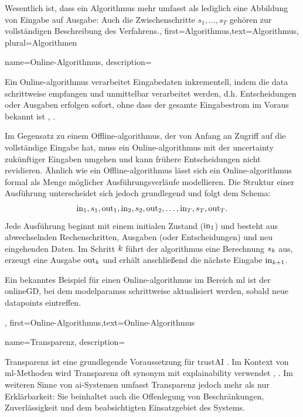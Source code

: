 {{{{{{		Wesentlich ist, dass ein Algorithmus mehr umfasst als lediglich eine Abbildung von Eingabe 
		auf Ausgabe: Auch die Zwischenschritte $s_1,\ldots,s_T$ gehören zur vollständigen Beschreibung des Verfahrens.},
	first={Algorithmus},text={Algorithmus}, plural={Algorithmen}
}

{name={Online-Algorithmus},
	description={Ein Online-\gls{algorithmus} verarbeitet Eingabedaten inkrementell, 
		indem die \gls{data} schrittweise empfangen und unmittelbar verarbeitet werden, 
		d.h. Entscheidungen oder Ausgaben erfolgen sofort, ohne dass der gesamte Eingabestrom im Voraus bekannt ist 
		\cite{PredictionLearningGames}, \cite{HazanOCO}. 
		
		Im Gegensatz zu einem Offline-\gls{algorithmus}, der von Anfang an Zugriff auf die vollständige Eingabe hat, 
		muss ein Online-\gls{algorithmus} mit der \gls{uncertainty} zukünftiger Eingaben umgehen und kann frühere 
		Entscheidungen nicht revidieren. Ähnlich wie ein Offline-\gls{algorithmus} lässt sich ein Online-\gls{algorithmus} 
		formal als Menge möglicher Ausführungsverläufe modellieren. Die Struktur einer Ausführung unterscheidet sich jedoch 
		grundlegend und folgt dem Schema:
		\[
		{\rm in}_{1},s_1,{\rm out}_{1},{\rm in}_{2},s_2,{\rm out}_{2},\ldots,{\rm in}_{T},s_T,{\rm out}_{T}.
		\]
		Jede Ausführung beginnt mit einem initialen Zustand (\({\rm in}_{1}\)) und besteht aus abwechselnden 
		Rechenschritten, Ausgaben (oder Entscheidungen) und neu eingehenden Daten. 
		Im Schritt \(k\) führt der \gls{algorithmus} eine Berechnung \(s_{k}\) aus, 
		erzeugt eine Ausgabe \({\rm out}_{k}\) und erhält anschließend die nächste Eingabe \({\rm in}_{k+1}\). 
		
		Ein bekanntes Beispiel für einen Online-\gls{algorithmus} im Bereich \gls{ml} ist der 
		\gls{onlineGD}, bei dem \glspl{modelparams} schrittweise aktualisiert werden, sobald neue 
		\glspl{datapoint} eintreffen.},
	first={Online-Algorithmus},text={Online-Algorithmus} 
}

{name={Transparenz},
	description={Transparenz ist eine grundlegende Voraussetzung für 
		\gls{trustAI} \cite{HLEGTrustworhtyAI}. Im Kontext von \gls{ml}-Methoden wird Transparenz 
		oft synonym mit \gls{explainability} verwendet \cite{JunXML2020}, \cite{gallese2023ai}. 
		Im weiteren Sinne von \gls{ai}-Systemen umfasst Transparenz jedoch mehr als nur 
		Erklärbarkeit: Sie beinhaltet auch die Offenlegung von Beschränkungen, Zuverlässigkeit 
		und dem beabsichtigten Einsatzgebiet des Systems. 
		
}}}}}}
